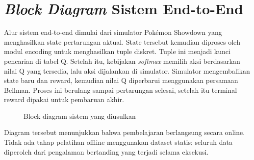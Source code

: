 \documentclass[11pt,a4paper,oneside]{report}
\begin{document}
\section{\textit{Block Diagram} Sistem End-to-End}
Alur sistem end-to-end dimulai dari simulator Pokémon Showdown yang menghasilkan state pertarungan aktual. State tersebut kemudian diproses oleh modul encoding untuk menghasilkan tuple diskret. Tuple ini menjadi kunci pencarian di tabel Q. Setelah itu, kebijakan \textit{softmax} memilih aksi berdasarkan nilai Q yang tersedia, lalu aksi dijalankan di simulator. Simulator mengembalikan state baru dan reward, kemudian nilai Q diperbarui menggunakan persamaan Bellman. Proses ini berulang sampai pertarungan selesai, setelah itu terminal reward dipakai untuk pembaruan akhir.

\begin{figure}[h!]
\centering
{}
\caption{Block diagram sistem yang diusulkan}
\label{fig:block-diagram}
\end{figure}

Diagram tersebut menunjukkan bahwa pembelajaran berlangsung secara online. Tidak ada tahap pelatihan offline menggunakan dataset statis; seluruh data diperoleh dari pengalaman bertanding yang terjadi selama eksekusi.
\end{document}
